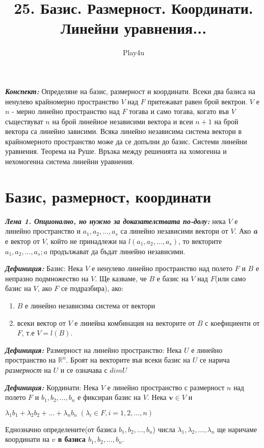 \documentclass[11pt]{article} %
\title{25. Базис. Размерност. Координати. Линейни уравнения...}
\author{Play4u}
\newcommand{\italicBold}[1]{\textbf{\emph{#1}}}
\newcommand{\definition}{\italicBold{Дефиниция: }}
\newcommand{\enumNum}{\renewcommand{\theenumi}{\arabic{enumi}}}
\begin{document}
\maketitle

\italicBold{Конспект:} Определяне на базис, размерност и координати. Всеки два базиса на ненулево крайномерно пространство $V$ над $F$ притежават равен брой вектрои. $V$ е $n$ - мерно линейно пространство над $F$ тогава и само тогава, когато във $V$ съществуват $n$ на брой линейное независими вектора и всеи $n+1$ на брой вектора са линейно зависими. Всяка линейно независима система вектори в крайномерното пространство може да се допълни до базис. Системи линейни уравнения. Теорема на Руше. Връзка между решенията на хомогенна и нехомогенна система линейни уравнения.


\section{Базис, размерност, координати}

\italicBold{Лема 1. Опционално, но нужно за доказателствата по-долу: } нека $V$ е линейно пространство и $a_{1}, a_{2}, ..., a_{s}$ са линейно независими вектори от $V$. Ако \textbf{\textit{a}} е вектор от $V$, който не принадлежи на $l(a_{1}, a_{2}, ..., a_{s})$, то векторите $a_{1}, a_{2}, ..., a_{s}; a$ продължават да бъдат линейно независими.\\\par   

\definition Базис: Нека $V$ е ненулево линейно пространство над полето $F$ и $B$ е непразно подмножество на $V$. Ще казваме, че $B$ е базис на $V$ над $F$(или само базис на $V$, ако $F$ се подразбира), ако: \\

\enumNum
\begin{enumerate}
	\item $B$ е линейно независима система от вектори \\
	\item всеки вектор от $V$ е линейна комбинация на векторите от $B$ с коефициенти от $F$, т.е $V = l(B)$.
\end{enumerate}\par

\definition Размерност на линейно пространство: Нека $U$ е линейно пространство на $\mathbb{R}^{n}$. Броят на векторите във всеки базис на $U$ се нарича \textit{размерност} на $U$ и се означава с $dimU$

\definition Кординати: Нека $V$ е линейно пространство с размерност $n$ над полето $F$ и $b_{1}, b_{2}, ..., b_{n}$ е фиксиран базис на $V$. Нека $\textbf{v} \in V$ и \\
\centerline{$\lambda_{1}b_{1} + \lambda_{2}b_{2}+...+\lambda_{n}b_{n} \; (\lambda_{i} \in F, i = 1, 2,..., n)$}
Еднозначно определените(от базиса $b_{1}, b_{2}, ..., b_{n}$) числа $\lambda_{1}, \lambda_{2}, ..., \lambda_{n}$ ще наричаме координати на \textbf{ $v$ в базиса $b_{1}, b_{2}, ..., b_{n}$}. \\\par
\end{document}
